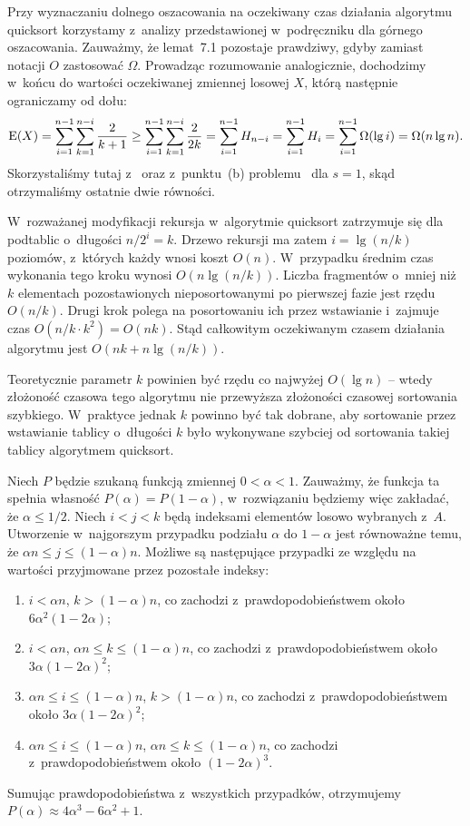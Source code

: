 \exercise %
Przy wyznaczaniu dolnego oszacowania na oczekiwany czas działania algorytmu quicksort korzystamy z~analizy przedstawionej w~podręczniku dla górnego oszacowania. Zauważmy, że lemat~7.1 pozostaje prawdziwy, gdyby zamiast notacji $O$ zastosować $\Omega$. Prowadząc rozumowanie analogicznie, dochodzimy w~końcu do wartości oczekiwanej zmiennej losowej $X$, którą następnie ograniczamy od dołu:
\[
	\operatorname{E}(X) = \sum_{i=1}^{n-1}\sum_{k=1}^{n-i}\frac{2}{k+1} \ge \sum_{i=1}^{n-1}\sum_{k=1}^{n-i}\frac{2}{2k} = \sum_{i=1}^{n-1}H_{n-i} = \sum_{i=1}^{n-1}H_i = \sum_{i=1}^{n-1}\Omega(\lg i) = \Omega(n\lg n).
\]
Skorzystaliśmy tutaj z~ oraz z~punktu~(b) problemu~ dla $s=1$, skąd otrzymaliśmy ostatnie dwie równości.

\exercise %
W~rozważanej modyfikacji rekursja w~algorytmie quicksort zatrzymuje się dla podtablic o~długości $n/2^i=k$. Drzewo rekursji ma zatem $i=\lg(n/k)$ poziomów, z~których każdy wnosi koszt $O(n)$. W~przypadku średnim czas wykonania tego kroku wynosi $O(n\lg(n/k))$. Liczba fragmentów o~mniej niż $k$ elementach pozostawionych nieposortowanymi po pierwszej fazie jest rzędu $O(n/k)$. Drugi krok polega na posortowaniu ich przez wstawianie i~zajmuje czas $O(n/k\cdot k^2)=O(nk)$. Stąd całkowitym oczekiwanym czasem działania algorytmu jest $O(nk+n\lg(n/k))$.

Teoretycznie parametr $k$ powinien być rzędu co najwyżej $O(\lg n)$ -- wtedy złożoność czasowa tego algorytmu nie przewyższa złożoności czasowej sortowania szybkiego. W~praktyce jednak $k$ powinno być tak dobrane, aby sortowanie przez wstawianie tablicy o~długości $k$ było wykonywane szybciej od sortowania takiej tablicy algorytmem quicksort.

\exercise %
Niech $P$ będzie szukaną funkcją zmiennej $0<\alpha<1$. Zauważmy, że funkcja ta spełnia własność $P(\alpha)=P(1-\alpha)$, w~rozwiązaniu będziemy więc zakładać, że $\alpha\le1/2$. Niech $i<j<k$ będą indeksami elementów losowo wybranych z~$A$. Utworzenie w~najgorszym przypadku podziału $\alpha$ do $1-\alpha$ jest równoważne temu, że $\alpha n\le j\le(1-\alpha)n$. Możliwe są następujące przypadki ze względu na wartości przyjmowane przez pozostałe indeksy:
\begin{enumerate}
	\item $i<\alpha n$, $k>(1-\alpha)n$, co zachodzi z~prawdopodobieństwem około $6\alpha^2(1-2\alpha)$;
	\item $i<\alpha n$, $\alpha n\le k\le(1-\alpha)n$, co zachodzi z~prawdopodobieństwem około $3\alpha(1-2\alpha)^2$;
	\item $\alpha n\le i\le(1-\alpha)n$, $k>(1-\alpha)n$, co zachodzi z~prawdopodobieństwem około $3\alpha(1-2\alpha)^2$;
	\item $\alpha n\le i\le(1-\alpha)n$, $\alpha n\le k\le(1-\alpha)n$, co zachodzi z~prawdopodobieństwem około $(1-2\alpha)^3$.
\end{enumerate}
Sumując prawdopodobieństwa z~wszystkich przypadków, otrzymujemy $P(\alpha)\approx4\alpha^3-6\alpha^2+1$.

